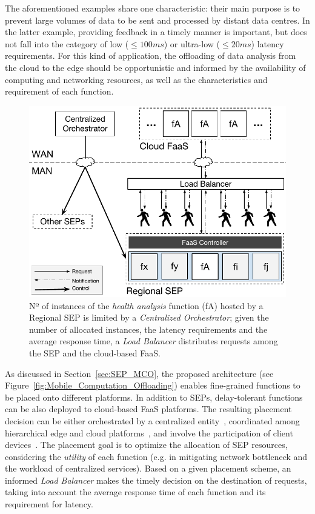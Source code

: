 The aforementioned examples share one characteristic: their main purpose is to prevent large volumes of data to be sent and processed by distant data centres. In the latter example, providing feedback in a timely manner is important, but does not fall into the category of low ($\leq 100ms$) or ultra-low ($\leq 20ms$) latency requirements. For this kind of application, the offloading of data analysis from the cloud to the edge should be opportunistic and informed by the availability of computing and networking resources, as well as the characteristics and requirement of each function.

\begin{figure}[tbp]
	\centering
	\includegraphics[width=\linewidth]{Figs/Edge_Data_Analytics_Personal_Assistant.pdf}
	\caption{Nº of instances of the \textit{health analysis} function (fA) hosted by a Regional SEP is limited by a \textit{Centralized Orchestrator}; given the number of allocated instances, the latency requirements and the average response time, a \textit{Load Balancer} distributes requests among the SEP and the cloud-based FaaS.}
	\label{fig:Edge_Data_Analytics_Personal_Assistant}
\end{figure}

As discussed in Section~\ref{sec:SEP_MCO}, the proposed architecture (see Figure~\ref{fig:Mobile_Computation_Offloading}) enables fine-grained functions to be placed onto different platforms. In addition to SEPs, delay-tolerant functions can be also deployed to cloud-based FaaS platforms. The resulting placement decision can be either orchestrated by a centralized entity~\cite{Taleb:2013}, coordinated among hierarchical edge and cloud platforms~\cite{Mach:2017}, and involve the participation of client devices~\cite{Baresi:2018}. The placement goal is to optimize the allocation of SEP resources, considering the \textit{utility} of each function (e.g. in mitigating network bottleneck and the workload of centralized services). Based on a given placement scheme, an informed \textit{Load Balancer} makes the timely decision on the destination of requests, taking into account the average response time of each function and its requirement for latency.%

